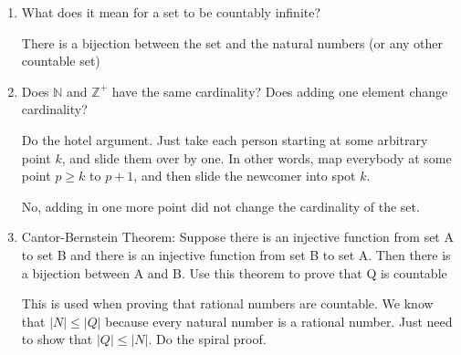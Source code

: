 \question 
\begin{enumerate}[label=(\alph*.)]
\item
What does it mean for a set to be countably infinite? 
\begin{solution}
There is a bijection between the set and the natural numbers (or any other countable set)
\end{solution}

\item
Does $\mathbb{N}$ and $\mathbb{Z}^+$ have the same cardinality? Does adding one element change cardinality?
\begin{solution}
Do the hotel argument. Just take each person starting at some arbitrary point $k$, and slide them over by one. In other words, map everybody at some point $p \ge k$ to $p + 1$, and then slide the newcomer into spot $k$.

No, adding in one more point did not change the cardinality of the set.
\end{solution}
\item
Cantor-Bernstein Theorem: Suppose there is an injective function from set A to set B and there is an injective function from set B to set A. Then there is a bijection between A and B.
Use this theorem to prove that Q is countable
\begin{solution}
This is used when proving that rational numbers are countable. 
We know that $|N| \le |Q|$ because every natural number is a rational number.
Just need to show that $|Q| \le |N|$. Do the spiral proof.
\end{solution}

\end{enumerate}